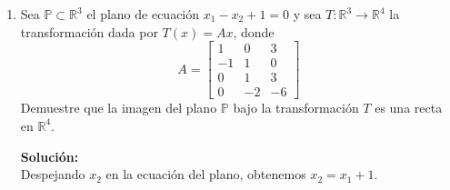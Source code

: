 \documentclass[12pt]{article}
\newenvironment{solucion}
{\begin{mdframed}[backgroundcolor=black!10]
		{\bf Solución:}\\
	}
	{
	\end{mdframed}
}
\newenvironment{preguntas}
{\begin{enumerate}\itemsep12pt
	}
	{
	\end{enumerate}
}
\newcommand{\ra}{\rightarrow}
\newcommand{\R}{\mathbb{R}}
\begin{document}
\begin{preguntas}
\begin{solucion}
\begin{enumerate}[a)]
Luego,
$$c_{23} = \begin{pmatrix}
(-2)^{2+1}\\ (-2)^{2+2}
\end{pmatrix} \cdot
\begin{pmatrix}
(-3)^{1-3}\\ (-3)^{2-3}
\end{pmatrix} = 
\begin{pmatrix}
-8\\ 16
\end{pmatrix} \cdot
\begin{pmatrix}
\frac{1}{9}\\ -\frac{1}{3}
\end{pmatrix}=
-8 \cdot \dfrac{1}{9} + 16 \cdot -\dfrac{1}{3} = -\dfrac{56}{9}
$$
\end{enumerate}
\end{solucion}
\item Sea $\mathbb{P} \subset \R^3$ el plano de ecuación $x_1-x_2+1=0$ y sea $T:\R^3 \ra \R^4$ la transformación dada por $T(x) = Ax$, donde
$$A = \begin{bmatrix}
1 & 0 & 3\\
-1 & 1 & 0 \\
0 & 1 & 3\\
0 & -2 & -6
\end{bmatrix}$$
Demuestre que la imagen del plano $\mathbb{P}$ bajo la transformación $T$ es una recta en $\R^4$.
\begin{solucion}
Despejando $x_2$ en la ecuación del plano, obtenemos $x_2 = x_1 + 1$.\\


\end{solucion}
\end{preguntas}
\end{document}
